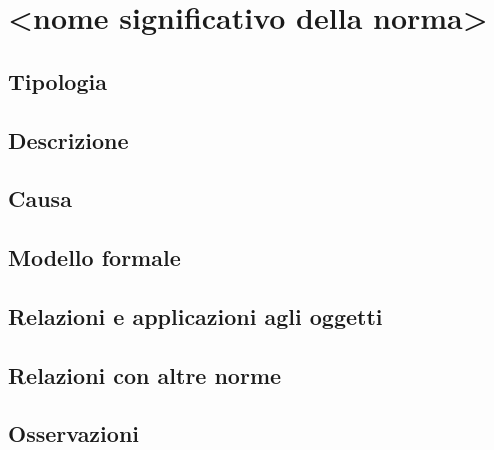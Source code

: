 \section{<nome significativo della norma>}

\subsection{Tipologia}

\subsection{Descrizione}

\subsection{Causa}

\subsection{Modello formale}

\subsection{Relazioni e applicazioni agli oggetti}

\subsection{Relazioni con altre norme}

\subsection{Osservazioni}
